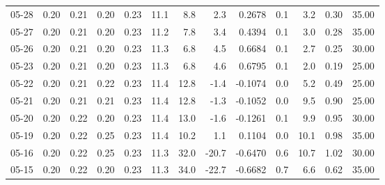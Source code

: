 \begin{threeparttable}
{\begin{tabular}{lrrrrrrrrrrrr}
  05-28 &          0.20 &          0.21 &          0.20 &        0.23 &                11.1 &                 8.8 &        2.3 &       0.2678 &                 0.1 &              3.2 &            0.30 &                  35.00 \\
  05-27 &          0.20 &          0.21 &          0.20 &        0.23 &                11.2 &                 7.8 &        3.4 &       0.4394 &                 0.1 &              3.0 &            0.28 &                  35.00 \\
  05-26 &          0.20 &          0.21 &          0.20 &        0.23 &                11.3 &                 6.8 &        4.5 &       0.6684 &                 0.1 &              2.7 &            0.25 &                  30.00 \\
  05-23 &          0.20 &          0.21 &          0.20 &        0.23 &                11.3 &                 6.8 &        4.6 &       0.6795 &                 0.1 &              2.0 &            0.19 &                  25.00 \\
  05-22 &          0.20 &          0.21 &          0.22 &        0.23 &                11.4 &                12.8 &       -1.4 &      -0.1074 &                 0.0 &              5.2 &            0.49 &                  25.00 \\
  05-21 &          0.20 &          0.21 &          0.21 &        0.23 &                11.4 &                12.8 &       -1.3 &      -0.1052 &                 0.0 &              9.5 &            0.90 &                  25.00 \\
  05-20 &          0.20 &          0.22 &          0.20 &        0.23 &                11.4 &                13.0 &       -1.6 &      -0.1261 &                 0.1 &              9.9 &            0.95 &                  30.00 \\
  05-19 &          0.20 &          0.22 &          0.25 &        0.23 &                11.4 &                10.2 &        1.1 &       0.1104 &                 0.0 &             10.1 &            0.98 &                  35.00 \\
  05-16 &          0.20 &          0.22 &          0.25 &        0.23 &                11.3 &                32.0 &      -20.7 &      -0.6470 &                 0.6 &             10.7 &            1.02 &                  30.00 \\
  05-15 &          0.20 &          0.22 &          0.20 &        0.23 &                11.3 &                34.0 &      -22.7 &      -0.6682 &                 0.7 &              6.6 &            0.62 &                  35.00 \\

\end{tabular}}
\end{threeparttable}
